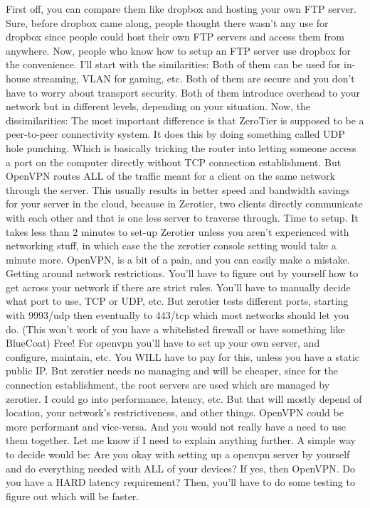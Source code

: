 
First off, you can compare them like dropbox and hosting your own FTP server. Sure, before dropbox came along, people thought there wasn't any use for dropbox since people could host their own FTP servers and access them from anywhere. Now, people who know how to setup an FTP server use dropbox for the convenience.
I'll start with the similarities:
Both of them can be used for in-house streaming, VLAN for gaming, etc.
Both of them are secure and you don't have to worry about transport security.
Both of them introduce overhead to your network but in different levels, depending on your situation.
Now, the dissimilarities:
The most important difference is that ZeroTier is supposed to be a peer-to-peer connectivity system. It does this by doing something called UDP hole punching. Which is basically tricking the router into letting someone access a port on the computer directly without TCP connection establishment. But OpenVPN routes ALL of the traffic meant for a client on the same network through the server. This usually results in better speed and bandwidth savings for your server in the cloud, because in Zerotier, two clients directly communicate with each other and that is one less server to traverse through.
Time to setup. It takes less than 2 minutes to set-up Zerotier unless you aren't experienced with networking stuff, in which case the the zerotier console setting would take a minute more. OpenVPN, is a bit of a pain, and you can easily make a mistake.
Getting around network restrictions. You'll have to figure out by yourself how to get across your network if there are strict rules. You'll have to manually decide what port to use, TCP or UDP, etc. But zerotier tests different ports, starting with 9993/udp then eventually to 443/tcp which most networks should let you do. (This won't work of you have a whitelisted firewall or have something like BlueCoat)
Free! For openvpn you'll have to set up your own server, and configure, maintain, etc. You WILL have to pay for this, unless you have a static public IP. But zerotier needs no managing and will be cheaper, since for the connection establishment, the root servers are used which are managed by zerotier.
I could go into performance, latency, etc. But that will mostly depend of location, your network's restrictiveness, and other things. OpenVPN could be more performant and vice-versa.
And you would not really have a need to use them together. Let me know if I need to explain anything further. A simple way to decide would be:
Are you okay with setting up a openvpn server by yourself and do everything needed with ALL of your devices? If yes, then OpenVPN.
Do you have a HARD latency requirement? Then, you'll have to do some testing to figure out which will be faster.




